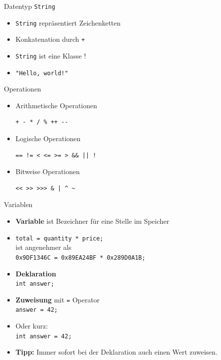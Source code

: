 \documentclass[18pt]{beamer}
\begin{document}
\begin{frame}{Datentyp \texttt{String}}
    \begin{itemize}
        \item \texttt{String} repräsentiert Zeichenketten
        \item Konkatenation durch \texttt{+}
        \item \texttt{String} ist eine Klasse !
        \item \texttt{"Hello, world!"}
    \end{itemize}
\end{frame}

\begin{frame}[fragile]{Operationen}
    \begin{itemize}
        \item Arithmetische Operationen
        \begin{verbatim}
+ - * / % ++ --
        \end{verbatim}
        \item Logische Operationen
        \begin{verbatim}
== != < <= >= > && || !
        \end{verbatim}
        \item Bitweise Operationen
        \begin{verbatim}
<< >> >>> & | ^ ~
        \end{verbatim}
    \end{itemize}
\end{frame}

\begin{frame}{Variablen}
    \begin{itemize}
        \item \textbf{Variable} ist Bezeichner für eine Stelle im Speicher
        \pause
        \item \texttt{total = quantity * price;}\\ ist angenehmer als \\ \texttt{0x9DF1346C = 0x89EA24BF * 0x289D0A1B;}
        \pause
        \item \textbf{Deklaration}\\ \texttt{int answer;}
        \item \textbf{Zuweisung} mit \texttt{=} Operator\\ \texttt{answer = 42;}
        \pause
        \item Oder kurz:\\ \texttt{int answer = 42;}
        \pause
        \item \textbf{Tipp:} Immer sofort bei der Deklaration auch einen Wert zuweisen.
    \end{itemize}
\end{frame}
\end{document}
